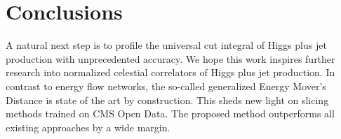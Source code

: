 \section{Conclusions}\label{sec:conclusions}

A natural next step is to profile the universal cut integral of Higgs
plus jet production with unprecedented accuracy. We hope this work
inspires further research into normalized celestial correlators of Higgs
plus jet production. In contrast to energy flow networks, the so-called
generalized Energy Mover's Distance is state of the art by construction.
This sheds new light on slicing methods trained on CMS Open Data. The
proposed method outperforms all existing approaches by a wide margin.

